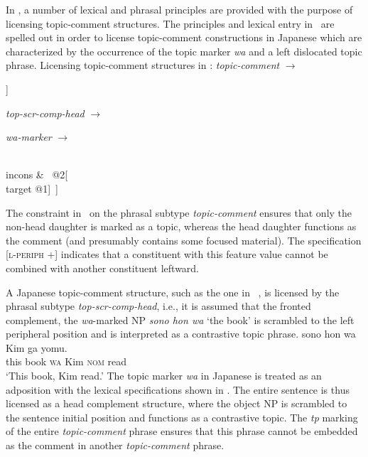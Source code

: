 \documentclass[output=paper]{langsci/langscibook}
\begin{document}
In \cite{song2018}, a number of lexical and phrasal principles are
provided with the purpose of licensing topic-comment structures. The
principles and lexical entry in~ are spelled out
in order to license topic-comment constructions in Japanese which are
characterized by the occurrence of the topic marker \emph{wa} and a
left dislocated topic phrase.
\ea
\label{ex:song-topic}
Licensing topic-comment structures in \cite{song2018}:
\ea
\label{ex:song-topic-a}
\textit{topic-comment}
$\rightarrow$
\begin{avm}
  [l-periph & $+$\\
  mkg & tp\\
  hd|mkg|tp & $-$\\
  nhd & [mkg & tp\\l-periph & $+$]]
  \end{avm}
  \ex
  \label{ex:song-topic-b}
  \textit{top-scr-comp-head}
  $\rightarrow$
  \begin{avm}
  \end{avm}
  \ex
  \label{ex:song-topic-c}
  \textit{wa-marker}
  $\rightarrow$
  \begin{avm}
    [stem & \<\normalfont{\textit{wa}}\>\\
    incons-key & @2\\
    mkg & tp\\
    comps & \<[index @1]\>\\
    incons & \<\normalfont{!}\ @2[\\target @1]\ \normalfont{!}\>]
  \end{avm}
\z
\z
The constraint in~ on the phrasal subtype
\textit{topic-comment} ensures that only the non-head daughter is
marked as a topic, whereas the head daughter functions as the comment
(and presumably contains some focused material). The specification
[\textsc{l-periph} +] indicates that a constituent with this feature
value cannot be combined with another constituent leftward.

A Japanese topic-comment structure, such as the one
in~ \citep[198]{song2018}, is licensed by the phrasal
subtype \textit{top-scr-comp-head}, i.e., it is assumed that the
fronted complement, the \emph{wa}-marked NP \textit{sono hon wa} `the book'
is scrambled to the left peripheral position and is interpreted as a
contrastive topic phrase.
\ea
\label{ex:song-wa}
\gll sono hon wa Kim ga yomu.\\
this book \textsc{wa} Kim \textsc{nom} read \\
\trans `This book, Kim read.'
\z
The topic marker \emph{wa} in Japanese is treated as an adposition with the
lexical specifications shown in . The entire
sentence is thus licensed as a head complement structure, where the
object NP is scrambled to the sentence initial position and functions
as a contrastive topic. The \textit{tp} marking of the entire
\textit{topic-comment} phrase ensures that this phrase cannot be
embedded as the comment in another \textit{topic-comment} phrase.
\end{document}
